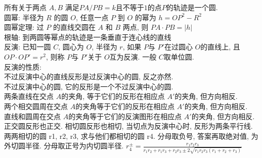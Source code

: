 \noindent 所有关于两点 $A,B$ 满足$PA/PB=k$且不等于$1$的点$P$的轨迹是一个圆.\\
圆幂: 半径为 $R$ 的圆 $O$, 任意一点 $P$ 到 $O$ 的幂为 $h=OP^2-R^2$\\
圆幂定理: 过 $P$ 的直线交圆在 $A$ 和 $B$ 两点, 则 $PA\cdot PB=|h|$\\
根轴: 到两圆等幂点的轨迹是一条垂直于连心线的直线\\
反演: 已知一圆 $C$, 圆心为 $O$, 半径为 $r$, 如果 $P$与 $P'$在过圆心 $O$的直线上, 且 $OP\cdot OP'=r^2$, 则称 $P$与 $P'$关于 $O$互为反演. 一般 $C$取单位圆.\\
反演的性质: \\
不过反演中心的直线反形是过反演中心的圆, 反之亦然.\\
不过反演中心的圆, 它的反形是一个不过反演中心的圆.\\
两条直线在交点 $A$的夹角, 等于它们的反形在相应点 $A'$的夹角, 但方向相反.\\
两个相交圆周在交点 $A$的夹角等于它们的反形在相应点 $A'$的夹角, 但方向相反.\\
直线和圆周在交点 $A$的夹角等于它们的反演图形在相应点 $A'$的夹角, 但方向相反.\\
正交圆反形也正交. 相切圆反形也相切, 当切点为反演中心时, 反形为两条平行线.
两两相切的圆 r1, r2, r3, 求与他们都相切的圆 r4.
分母取负号, 答案再取绝对值, 为外切圆半径.
分母取正号为内切圆半径.
$ r^{\pm}_4 = \frac{r_1 r_2 r_3}{r_1 r_2 + r_1 r_3 + r_2 r_3 \pm 2\sqrt{r_1r_2r_3(r_1 + r_2 + r_3)}} $
